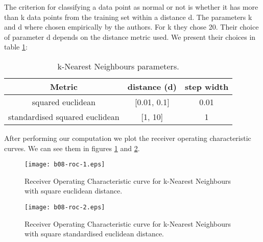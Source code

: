 \documentclass[reqno,openany,12pt]{amsbook}
\begin{document}
The criterion for classifying a data point as normal or not is whether it has more than k data points from the training set within a distance d. The parameters k and d where chosen empirically by the authors. For k they chose 20. Their choice of parameter d depends on the distance metric used. We present their choices\cite{adf1} in table \ref{knnt2}:
\begin{table}
\begin{tabular}{|c|c|c|}
\hline
Metric &  distance (d) & step width  \\ \hline 
squared euclidean & [0.01, 0.1] & 0.01 \\ \hline
standardised squared euclidean & [1, 10] & 1 \\ \hline
\end{tabular}
\vspace{5pt}
\caption{k-Nearest Neighbours parameters.}
\label{knnt2}
\end{table}

After performing our computation we plot the receiver operating characteristic curves. We can see them in figures \ref{knnroc1} and \ref{knnroc2}.

\begin{figure}
\texttt{[image: b08-roc-1.eps]}
\caption{Receiver Operating Characteristic curve for k-Nearest Neighbours with square euclidean distance.}
\label{knnroc1}
\end{figure}
\begin{figure}
\texttt{[image: b08-roc-2.eps]}
\caption{Receiver Operating Characteristic curve for k-Nearest Neighbours with square standardised euclidean distance.}
\label{knnroc2}
\end{figure}
\end{document}
